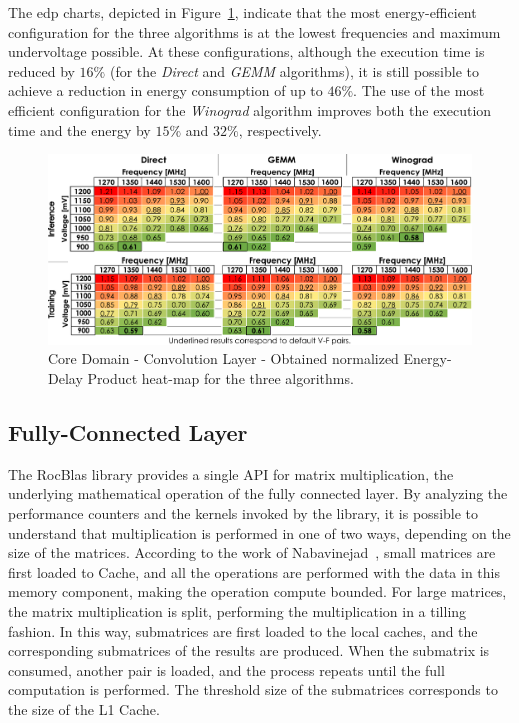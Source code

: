 The \acrshort{edp} charts, depicted in Figure~\ref{fig:Convolution_EDP}, indicate that the most energy-efficient configuration for the three algorithms is at the lowest frequencies and maximum undervoltage possible. At these configurations, although the execution time is reduced by $16\%$ (for the \textit{Direct} and \textit{GEMM} algorithms), it is still possible to achieve a reduction in energy consumption of up to $46\%$. The use of the most efficient configuration for the \textit{Winograd} algorithm improves both the execution time and the energy by $15\%$ and $32\%$, respectively.

\begin{figure}[htbp]
    \centering
        \includegraphics[width=\textwidth]{Figures/Application To Deep Learning/Convolution_EDP.pdf}
        \caption{Core Domain - Convolution Layer - Obtained normalized Energy-Delay Product heat-map for the three algorithms.}
    \label{fig:Convolution_EDP}
\end{figure}



\subsection{Fully-Connected Layer}


The RocBlas library provides a single API for matrix multiplication, the underlying mathematical operation of the fully connected layer. By analyzing the performance counters and the kernels invoked by the library, it is possible to understand that multiplication is performed in one of two ways, depending on the size of the matrices.
According to the work of Nabavinejad~\cite{dutot_high-performance_2016}, small matrices are first loaded to Cache, and all the operations are performed with the data in this memory component, making the operation compute bounded. For large matrices, the matrix multiplication is split, performing the multiplication in a tilling fashion. In this way, submatrices are first loaded to the local caches, and the corresponding submatrices of the results are produced. When the submatrix is consumed, another pair is loaded, and the process repeats until the full computation is performed. The threshold size of the submatrices corresponds to the size of the L1 Cache. 



